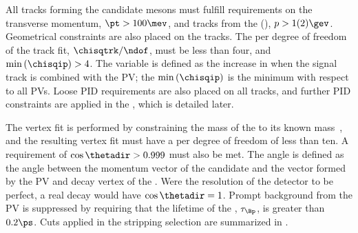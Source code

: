 All tracks forming the candidate mesons must fulfill requirements on the transverse momentum,
$\pt>100\mev$, and tracks from the \Ds(\phii), $p>1(2)\gev$.
Geometrical constraints are also placed on the tracks.
The \chisq per degree of freedom of the track fit, $\chisqtrk/\ndof$, must be less than four, and
$\min\left(\chisqip\right)>4$.
The variable \chisqip is defined as the increase in \chisqvtx when the signal track is combined
with the PV; the $\min\left(\chisqip\right)$ is the minimum \chisqip with respect to all PVs.
Loose PID requirements are also placed on all tracks, and further PID constraints are applied in
the \bdt, which is detailed later.

The \Bp vertex fit is performed by constraining the mass of the \Ds to its known
mass~\cite{PDG2012}, and the resulting vertex fit must have a \chisqvtx per degree of freedom of
less than ten.
A requirement of $\cos\thetadir>0.999$ must also be met.
The angle \thetadir is defined as the angle between the momentum vector of the \Bp candidate and
the vector formed by the PV and decay vertex of the \Bp.
Were the resolution of the \lhcb detector to be perfect, a real decay would have $\cos\thetadir=1$.
Prompt background from the PV is suppressed by requiring that the lifetime of the \Bp,
$\tau_{\Bp}$, is greater than $0.2\ps$.
Cuts applied in the stripping selection are summarized in .





